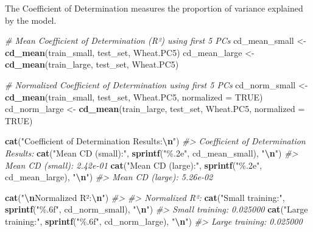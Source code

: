 \documentclass[
]{article}
\newenvironment{Shaded}{\begin{snugshade}}{\end{snugshade}}
\newcommand{\AttributeTok}[1]{\textcolor[rgb]{0.13,0.29,0.53}{#1}}
\newcommand{\CommentTok}[1]{\textcolor[rgb]{0.56,0.35,0.01}{\textit{#1}}}
\newcommand{\ConstantTok}[1]{\textcolor[rgb]{0.56,0.35,0.01}{#1}}
\newcommand{\FunctionTok}[1]{\textcolor[rgb]{0.13,0.29,0.53}{\textbf{#1}}}
\newcommand{\NormalTok}[1]{#1}
\newcommand{\OtherTok}[1]{\textcolor[rgb]{0.56,0.35,0.01}{#1}}
\newcommand{\SpecialCharTok}[1]{\textcolor[rgb]{0.81,0.36,0.00}{\textbf{#1}}}
\newcommand{\StringTok}[1]{\textcolor[rgb]{0.31,0.60,0.02}{#1}}
\begin{document}
The Coefficient of Determination measures the proportion of variance
explained by the model.

\begin{Shaded}
\begin{Highlighting}[]
\CommentTok{\# Mean Coefficient of Determination (R²) using first 5 PCs}
\NormalTok{cd\_mean\_small }\OtherTok{\textless{}{-}} \FunctionTok{cd\_mean}\NormalTok{(train\_small, test\_set, Wheat.PC5)}
\NormalTok{cd\_mean\_large }\OtherTok{\textless{}{-}} \FunctionTok{cd\_mean}\NormalTok{(train\_large, test\_set, Wheat.PC5)}

\CommentTok{\# Normalized Coefficient of Determination using first 5 PCs}
\NormalTok{cd\_norm\_small }\OtherTok{\textless{}{-}} \FunctionTok{cd\_mean}\NormalTok{(train\_small, test\_set, Wheat.PC5, }\AttributeTok{normalized =} \ConstantTok{TRUE}\NormalTok{)}
\NormalTok{cd\_norm\_large }\OtherTok{\textless{}{-}} \FunctionTok{cd\_mean}\NormalTok{(train\_large, test\_set, Wheat.PC5, }\AttributeTok{normalized =} \ConstantTok{TRUE}\NormalTok{)}

\FunctionTok{cat}\NormalTok{(}\StringTok{"Coefficient of Determination Results:}\SpecialCharTok{\textbackslash{}n}\StringTok{"}\NormalTok{)}
\CommentTok{\#\textgreater{} Coefficient of Determination Results:}
\FunctionTok{cat}\NormalTok{(}\StringTok{"Mean CD (small):"}\NormalTok{, }\FunctionTok{sprintf}\NormalTok{(}\StringTok{"\%.2e"}\NormalTok{, cd\_mean\_small), }\StringTok{"}\SpecialCharTok{\textbackslash{}n}\StringTok{"}\NormalTok{)}
\CommentTok{\#\textgreater{} Mean CD (small): 2.42e{-}01}
\FunctionTok{cat}\NormalTok{(}\StringTok{"Mean CD (large):"}\NormalTok{, }\FunctionTok{sprintf}\NormalTok{(}\StringTok{"\%.2e"}\NormalTok{, cd\_mean\_large), }\StringTok{"}\SpecialCharTok{\textbackslash{}n}\StringTok{"}\NormalTok{)}
\CommentTok{\#\textgreater{} Mean CD (large): 5.26e{-}02}

\FunctionTok{cat}\NormalTok{(}\StringTok{"}\SpecialCharTok{\textbackslash{}n}\StringTok{Normalized R²:}\SpecialCharTok{\textbackslash{}n}\StringTok{"}\NormalTok{)}
\CommentTok{\#\textgreater{} }
\CommentTok{\#\textgreater{} Normalized R²:}
\FunctionTok{cat}\NormalTok{(}\StringTok{"Small training:"}\NormalTok{, }\FunctionTok{sprintf}\NormalTok{(}\StringTok{"\%.6f"}\NormalTok{, cd\_norm\_small), }\StringTok{"}\SpecialCharTok{\textbackslash{}n}\StringTok{"}\NormalTok{)}
\CommentTok{\#\textgreater{} Small training: 0.025000}
\FunctionTok{cat}\NormalTok{(}\StringTok{"Large training:"}\NormalTok{, }\FunctionTok{sprintf}\NormalTok{(}\StringTok{"\%.6f"}\NormalTok{, cd\_norm\_large), }\StringTok{"}\SpecialCharTok{\textbackslash{}n}\StringTok{"}\NormalTok{)}
\CommentTok{\#\textgreater{} Large training: 0.025000}
\end{Highlighting}
\end{Shaded}
\end{document}
